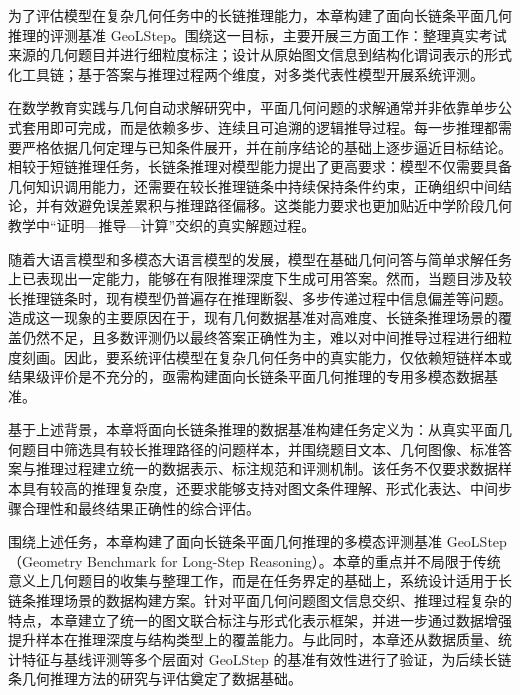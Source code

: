 

为了评估模型在复杂几何任务中的长链推理能力，本章构建了面向长链条平面几何推理的评测基准 GeoLStep。围绕这一目标，主要开展三方面工作：整理真实考试来源的几何题目并进行细粒度标注；设计从原始图文信息到结构化谓词表示的形式化工具链；基于答案与推理过程两个维度，对多类代表性模型开展系统评测。


在数学教育实践与几何自动求解研究中，平面几何问题的求解通常并非依靠单步公式套用即可完成，而是依赖多步、连续且可追溯的逻辑推导过程。每一步推理都需要严格依据几何定理与已知条件展开，并在前序结论的基础上逐步逼近目标结论。相较于短链推理任务，长链条推理对模型能力提出了更高要求：模型不仅需要具备几何知识调用能力，还需要在较长推理链条中持续保持条件约束，正确组织中间结论，并有效避免误差累积与推理路径偏移。这类能力要求也更加贴近中学阶段几何教学中“证明—推导—计算”交织的真实解题过程。

随着大语言模型和多模态大语言模型的发展，模型在基础几何问答与简单求解任务上已表现出一定能力，能够在有限推理深度下生成可用答案。然而，当题目涉及较长推理链条时，现有模型仍普遍存在推理断裂、多步传递过程中信息偏差等问题。造成这一现象的主要原因在于，现有几何数据基准对高难度、长链条推理场景的覆盖仍然不足，且多数评测仍以最终答案正确性为主，难以对中间推导过程进行细粒度刻画。因此，要系统评估模型在复杂几何任务中的真实能力，仅依赖短链样本或结果级评价是不充分的，亟需构建面向长链条平面几何推理的专用多模态数据基准。

基于上述背景，本章将面向长链条推理的数据基准构建任务定义为：从真实平面几何题目中筛选具有较长推理路径的问题样本，并围绕题目文本、几何图像、标准答案与推理过程建立统一的数据表示、标注规范和评测机制。该任务不仅要求数据样本具有较高的推理复杂度，还要求能够支持对图文条件理解、形式化表达、中间步骤合理性和最终结果正确性的综合评估。

围绕上述任务，本章构建了面向长链条平面几何推理的多模态评测基准 GeoLStep（Geometry Benchmark for Long-Step Reasoning）。本章的重点并不局限于传统意义上几何题目的收集与整理工作，而是在任务界定的基础上，系统设计适用于长链条推理场景的数据构建方案。针对平面几何问题图文信息交织、推理过程复杂的特点，本章建立了统一的图文联合标注与形式化表示框架，并进一步通过数据增强提升样本在推理深度与结构类型上的覆盖能力。与此同时，本章还从数据质量、统计特征与基线评测等多个层面对 GeoLStep 的基准有效性进行了验证，为后续长链条几何推理方法的研究与评估奠定了数据基础。

